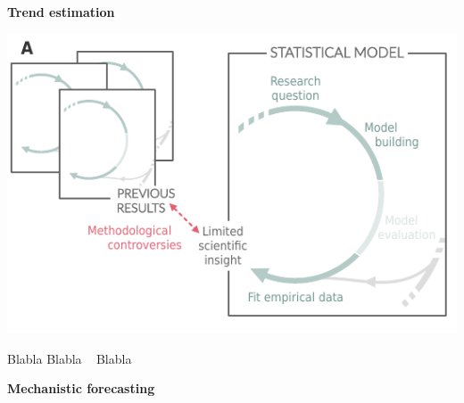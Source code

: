 \documentclass[11pt]{article}
\begin{document}
\begin{tcolorbox}[
sharp corners=all,
colback=white,
colframe=black,
size=tight,
boxrule=0.1mm,
left=3mm,right=3mm, top = 2mm, bottom = 2mm,
fontupper=\small
]
{\begin{multicols}{2}

\centerline{\bf Trend estimation}

\begin{minipage}[t]{\linewidth}
    \includegraphics[width=\linewidth]{figures/trendestimation_details}

    \vspace{-0.6cm}\label{fig:trends}
\end{minipage}
\vspace{0.1cm}

\noindent Blabla \newline
Blabla \newline
 \ \newline
Blabla \newline
\vfill

\columnbreak

\centerline{\bf Mechanistic forecasting}
\bigskip


\end{multicols}}
\end{tcolorbox}
\end{document}
